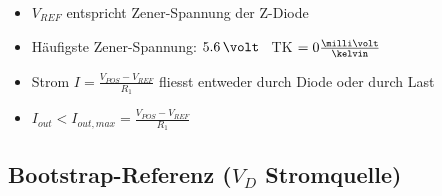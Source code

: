\hfill
\begin{minipage}[c]{0.78\columnwidth}
    \begin{itemize}
        \item $V_{REF}$ entspricht Zener-Spannung der Z-Diode
        \item Häufigste Zener-Spannung: $5.6 \, \volt$ \textrightarrow\ TK $= 0 \frac{\milli \volt}{\kelvin}$
        \item Strom $I = \frac{V_{POS} - V_{REF}}{R_1}$ fliesst entweder durch Diode oder durch Last
        \item $I_{out} < I_{out, max} = \frac{V_{POS} - V_{REF}}{R_1}$
    \end{itemize}

\end{minipage}


\subsection[Bootstrap-Referenz (VD Stromquelle)]{Bootstrap-Referenz ($V_D$ Stromquelle)}

